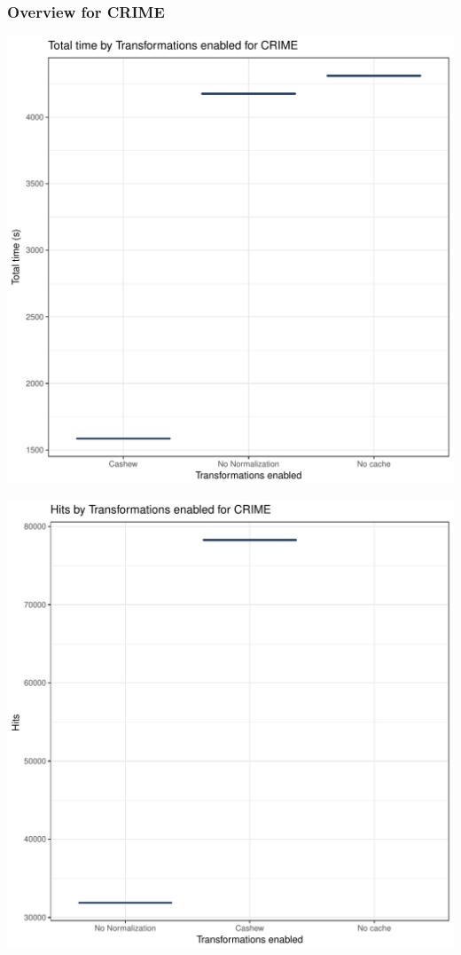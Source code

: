 \documentclass{article}\usepackage[]{graphicx}\usepackage[]{color}
\makeatletter
\def\maxwidth{ %
  \ifdim\Gin@nat@width>\linewidth
    \linewidth
  \else
    \Gin@nat@width
  \fi
}
\newenvironment{knitrout}{}{} %
\makeatother
\begin{document}
\subsubsection{Overview for CRIME}
\begin{knitrout}
\color{fgcolor}
\includegraphics[width=\maxwidth]{figure/crime-1} 

\includegraphics[width=\maxwidth]{figure/crime-2} 


\end{knitrout}
\end{document}
